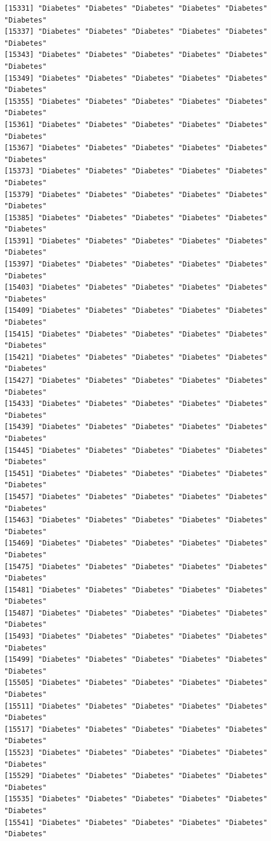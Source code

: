 \documentclass[
  letterpaper,
  DIV=11,
  numbers=noendperiod]{scrartcl}
\begin{document}
\begin{verbatim}
[15331] "Diabetes" "Diabetes" "Diabetes" "Diabetes" "Diabetes" "Diabetes"
[15337] "Diabetes" "Diabetes" "Diabetes" "Diabetes" "Diabetes" "Diabetes"
[15343] "Diabetes" "Diabetes" "Diabetes" "Diabetes" "Diabetes" "Diabetes"
[15349] "Diabetes" "Diabetes" "Diabetes" "Diabetes" "Diabetes" "Diabetes"
[15355] "Diabetes" "Diabetes" "Diabetes" "Diabetes" "Diabetes" "Diabetes"
[15361] "Diabetes" "Diabetes" "Diabetes" "Diabetes" "Diabetes" "Diabetes"
[15367] "Diabetes" "Diabetes" "Diabetes" "Diabetes" "Diabetes" "Diabetes"
[15373] "Diabetes" "Diabetes" "Diabetes" "Diabetes" "Diabetes" "Diabetes"
[15379] "Diabetes" "Diabetes" "Diabetes" "Diabetes" "Diabetes" "Diabetes"
[15385] "Diabetes" "Diabetes" "Diabetes" "Diabetes" "Diabetes" "Diabetes"
[15391] "Diabetes" "Diabetes" "Diabetes" "Diabetes" "Diabetes" "Diabetes"
[15397] "Diabetes" "Diabetes" "Diabetes" "Diabetes" "Diabetes" "Diabetes"
[15403] "Diabetes" "Diabetes" "Diabetes" "Diabetes" "Diabetes" "Diabetes"
[15409] "Diabetes" "Diabetes" "Diabetes" "Diabetes" "Diabetes" "Diabetes"
[15415] "Diabetes" "Diabetes" "Diabetes" "Diabetes" "Diabetes" "Diabetes"
[15421] "Diabetes" "Diabetes" "Diabetes" "Diabetes" "Diabetes" "Diabetes"
[15427] "Diabetes" "Diabetes" "Diabetes" "Diabetes" "Diabetes" "Diabetes"
[15433] "Diabetes" "Diabetes" "Diabetes" "Diabetes" "Diabetes" "Diabetes"
[15439] "Diabetes" "Diabetes" "Diabetes" "Diabetes" "Diabetes" "Diabetes"
[15445] "Diabetes" "Diabetes" "Diabetes" "Diabetes" "Diabetes" "Diabetes"
[15451] "Diabetes" "Diabetes" "Diabetes" "Diabetes" "Diabetes" "Diabetes"
[15457] "Diabetes" "Diabetes" "Diabetes" "Diabetes" "Diabetes" "Diabetes"
[15463] "Diabetes" "Diabetes" "Diabetes" "Diabetes" "Diabetes" "Diabetes"
[15469] "Diabetes" "Diabetes" "Diabetes" "Diabetes" "Diabetes" "Diabetes"
[15475] "Diabetes" "Diabetes" "Diabetes" "Diabetes" "Diabetes" "Diabetes"
[15481] "Diabetes" "Diabetes" "Diabetes" "Diabetes" "Diabetes" "Diabetes"
[15487] "Diabetes" "Diabetes" "Diabetes" "Diabetes" "Diabetes" "Diabetes"
[15493] "Diabetes" "Diabetes" "Diabetes" "Diabetes" "Diabetes" "Diabetes"
[15499] "Diabetes" "Diabetes" "Diabetes" "Diabetes" "Diabetes" "Diabetes"
[15505] "Diabetes" "Diabetes" "Diabetes" "Diabetes" "Diabetes" "Diabetes"
[15511] "Diabetes" "Diabetes" "Diabetes" "Diabetes" "Diabetes" "Diabetes"
[15517] "Diabetes" "Diabetes" "Diabetes" "Diabetes" "Diabetes" "Diabetes"
[15523] "Diabetes" "Diabetes" "Diabetes" "Diabetes" "Diabetes" "Diabetes"
[15529] "Diabetes" "Diabetes" "Diabetes" "Diabetes" "Diabetes" "Diabetes"
[15535] "Diabetes" "Diabetes" "Diabetes" "Diabetes" "Diabetes" "Diabetes"
[15541] "Diabetes" "Diabetes" "Diabetes" "Diabetes" "Diabetes" "Diabetes"

\end{verbatim}
\end{document}
